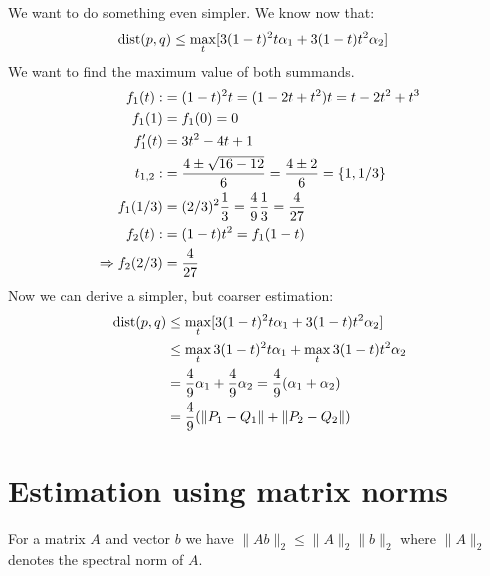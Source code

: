 We want to do something even simpler.
We know now that:
%
\begin{align*}
\mathrm{dist}(p,q) &\leq \max_t [ 3(1-t)^2 t \alpha_1 + 3 (1-t) t^2 \alpha_2 ]
\end{align*}
%
We want to find the maximum value of both summands.
%
\begin{align*}
f_1(t) :&= (1-t)^2 t = (1-2t+t^2)t = t - 2t^2 + t^3 \\
f_1(1) &= f_1(0) = 0 \\
f_1'(t) &= 3t^2 -4t +1 \\
t_{1,2} :&= \frac{4 \pm \sqrt{16-12}}{6} = \frac {4 \pm 2}6 = \{1, 1/3\} \\
f_1(1/3) &= (2/3)^2 \frac 13 = \frac 49 \frac 13 = \frac{4}{27} \\
f_2(t) :&= (1-t)t^2 = f_1(1-t) \\
\Rightarrow f_2(2/3) &= \frac 4{27}
\end{align*}
%
Now we can derive a simpler, but coarser estimation:
%
\begin{align*}
\mathrm{dist}(p,q) &\leq \max_t  [ 3(1-t)^2 t \alpha_1 + 3 (1-t) t^2 \alpha_2 ] \\
&\leq \max_t 3(1-t)^2 t \alpha_1 + \max_t 3 (1-t) t^2 \alpha_2 \\
&= \frac 49 \alpha_1 + \frac 49 \alpha_2 = \frac 49 (\alpha_1 + \alpha_2) \\
&= \frac 49 (\|P_1-Q_1\| + \|P_2-Q_2\|)
\end{align*}

\section{Estimation using matrix norms}

For a matrix $A$ and vector $b$ we have $\|A b\|_2 \leq \|A\|_2 \|b\|_2$ where $\|A\|_2$ denotes the spectral norm of $A$.

